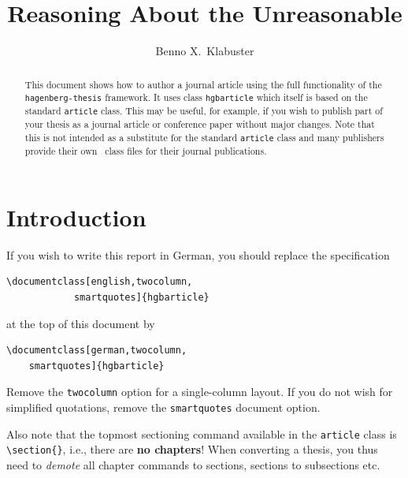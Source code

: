 \documentclass[english,twocolumn,smartquotes]{hgbarticle}
\begin{document}

\author{Benno X.\ Klabuster}
\title{Reasoning About the Unreasonable}
\date{}

\maketitle

\begin{abstract}\noindent
This document shows how to author a journal article using the full functionality
of the \texttt{hagenberg-thesis} framework. It uses class \texttt{hgb\-article} 
which itself is based on the standard \latex \texttt{article} class. This may be 
useful, for example, if you wish to publish part of your thesis as a journal article
or conference paper without major changes.
Note that this is not intended as a substitute for the standard \texttt{article}
class and many publishers provide their own \latex\ class files for their journal
publications.
\end{abstract}


\section{Introduction}

If you wish to write this report in German, you should replace the specification
%
\begin{verbatim}
\documentclass[english,twocolumn,
            smartquotes]{hgbarticle}
\end{verbatim}
%
at the top of this document by
%
\begin{verbatim}
\documentclass[german,twocolumn,
    smartquotes]{hgbarticle}
\end{verbatim}
%
Remove the \texttt{twocolumn} option for a single-column layout. If you do not
wish for simplified quotations, remove the \texttt{smartquotes} document option.

Also note that the topmost sectioning command available in the \texttt{article}
class is \verb!\section{}!, i.e., there are \textbf{no chapters}!
When converting a thesis, you thus need to \emph{demote} all chapter commands to
sections, sections to subsections etc.
\end{document}
